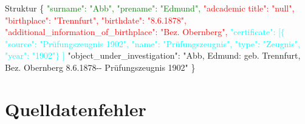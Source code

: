 \documentclass[12pt]{beamer}
\begin{document}
\begin{large}
\begin{frame}
 \begin{block}{Struktur}
  \small
  \{
  \newline
  \hspace*{0.5cm}
  \textcolor{green}{"{}surname"{}: "{}Abb"{},}
  \newline
  \hspace*{0.5cm}
  \textcolor{green}{"{}prename"{}: "{}Edmund"{},}
  \newline 
  \hspace*{0.5cm}
  \textcolor{red}{"{}adcademic title"{}: "{}null"{},}
  \newline 
  \hspace*{0.5cm}
  \textcolor{red}{"{}birthplace"{}: "{}Trennfurt"{},}
  \newline
  \hspace*{0.5cm}
  \textcolor{red}{"{}birthdate"{}: "{}8.6.1878"{},}
  \newline
  \hspace*{0.5cm}
  \textcolor{red}{"{}additional\_information\_of\_birthplace"{}: "{}Bez. Obernberg"{},}
  \newline
  \hspace*{0.5cm}
  \textcolor{cyan}{"{}certificate"{}: [$\{$
  \newline 
  \hspace*{1cm}"{}source"{}: "{}Prüfungszeugnis 1902"{},
  \newline 
  \hspace*{1cm}"{}name"{}: "{}Prüfungszeugnis"{},
  \newline 
  \hspace*{1cm}"{}type"{}: "{}Zeugnis"{},
  \newline 
  \hspace*{1cm}"{}year"{}: "{}1902"{}$\}$ ]} 
  \newline
  \hspace*{0.5cm}
  "{}object\_under\_investigation"{}: "{}Abb, Edmund: geb. Trennfurt,\\
  \hspace*{0.5cm}
   Bez. Obernberg 8.6.1878-{}- Prüfungszeugnis 1902"{}
  \newline
  \}
 \end{block} 
\end{frame}


\section{Quelldatenfehler}

\end{large}
\end{document}
